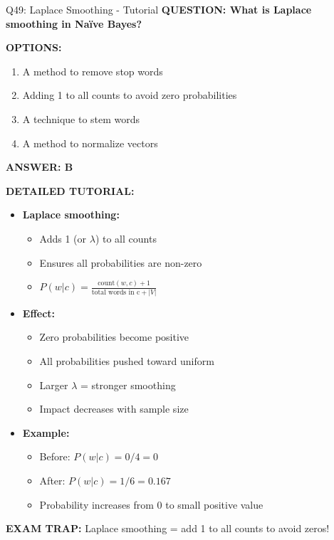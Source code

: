 \documentclass[8pt]{beamer}
\begin{document}
	\begin{frame}{Q49: Laplace Smoothing - Tutorial}
		\fontsize{6.5}{7.5}\selectfont
		\textbf{QUESTION: What is Laplace smoothing in Naïve Bayes?}
		
		\vspace{0.1cm}
		\textbf{OPTIONS:}
		\begin{enumerate}
			\item A method to remove stop words
			\item Adding 1 to all counts to avoid zero probabilities
			\item A technique to stem words
			\item A method to normalize vectors
		\end{enumerate}
		
		\vspace{0.1cm}
		\textcolor{myblue}{\textbf{ANSWER: B}}
		
		\vspace{0.1cm}
		\textbf{DETAILED TUTORIAL:}
		\begin{itemize}
			\item \textbf{Laplace smoothing:}
			\begin{itemize}
				\item Adds 1 (or $\lambda$) to all counts
				\item Ensures all probabilities are non-zero
				\item $P(w|c) = \frac{\text{count}(w,c) + 1}{\text{total words in c} + |V|}$
			\end{itemize}
			\item \textbf{Effect:}
			\begin{itemize}
				\item Zero probabilities become positive
				\item All probabilities pushed toward uniform
				\item Larger $\lambda$ = stronger smoothing
				\item Impact decreases with sample size
			\end{itemize}
			\item \textbf{Example:}
			\begin{itemize}
				\item Before: $P(w|c) = 0/4 = 0$
				\item After: $P(w|c) = 1/6 = 0.167$
				\item Probability increases from 0 to small positive value
			\end{itemize}
		\end{itemize}
		
		\textcolor{myred}{\textbf{EXAM TRAP:}} Laplace smoothing = \textcolor{myblue}{add 1 to all counts to avoid zeros}!
	\end{frame}
	
\end{document}
